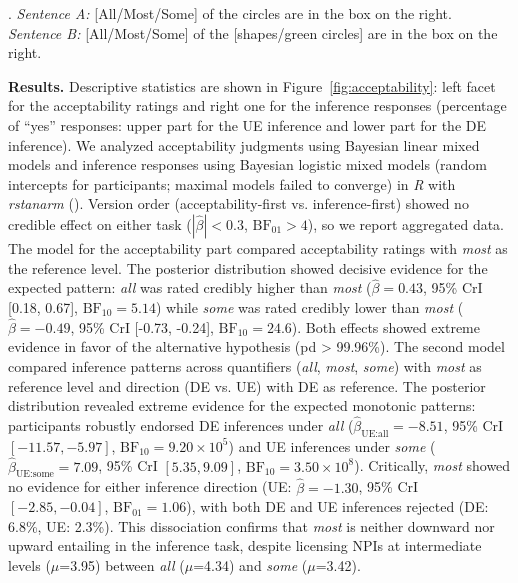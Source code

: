 \documentclass[12pt, a4]{article}
\begin{document}
\ex.\label{inftask}
\textit{Sentence A:} [All/Most/Some] of the circles are in the box on the right.\\
\textit{Sentence B:} [All/Most/Some] of the [shapes/green circles] are in the box on the right.\vspace{-2mm}

\noindent \textbf{Results.} Descriptive statistics are shown in Figure~\ref{fig:acceptability}: left facet for the acceptability ratings and right one for the inference responses (percentage of ``yes'' responses: upper part for the UE inference and lower part for the DE inference). We analyzed acceptability judgments using Bayesian linear mixed models and inference responses using Bayesian logistic mixed models (random intercepts for participants; maximal models failed to converge) in \textit{R} with \textit{rstanarm} (\cite{rstanarm}). Version order (acceptability-first vs. inference-first) showed no credible effect on either task ($|\hat{\beta}| < 0.3$, $\text{BF}_{01} > 4$), so we report aggregated data. The model for the acceptability part compared acceptability ratings with \textit{most} as the reference level. The posterior distribution showed decisive evidence for the expected pattern: \textit{all} was rated credibly higher than \textit{most} ($\hat{\beta}=0.43$, 95\% CrI [0.18, 0.67], $\text{BF}_{10}=5.14$) while \textit{some} was rated credibly lower than \textit{most} ($\hat{\beta}=-0.49$, 95\% CrI [-0.73, -0.24], $\text{BF}_{10}=24.6$). Both effects showed extreme evidence in favor of the alternative hypothesis (pd > 99.96\%). The second model compared inference patterns across quantifiers (\textit{all}, \textit{most}, \textit{some}) with \textit{most} as reference level and direction (DE vs. UE) with DE as reference. The posterior distribution revealed extreme evidence for the expected monotonic patterns: participants robustly endorsed DE inferences under \textit{all} ($\hat{\beta}_{\text{UE:all}}=-8.51$, 95\% CrI $[-11.57, -5.97]$, $\text{BF}_{10}=9.20\times10^5$) and UE inferences under \textit{some} ($\hat{\beta}_{\text{UE:some}}=7.09$, 95\% CrI $[5.35, 9.09]$, $\text{BF}_{10}=3.50\times10^8$). Critically, \textit{most} showed no evidence for either inference direction (UE: $\hat{\beta}=-1.30$, 95\% CrI $[-2.85, -0.04]$, $\text{BF}_{01}=1.06$), with both DE and UE inferences rejected (DE: 6.8\%, UE: 2.3\%). This dissociation confirms that \textit{most} is neither downward nor upward entailing in the inference task, despite licensing NPIs at intermediate levels ($\mu$=3.95) between \textit{all} ($\mu$=4.34) and \textit{some} ($\mu$=3.42).
\end{document}
